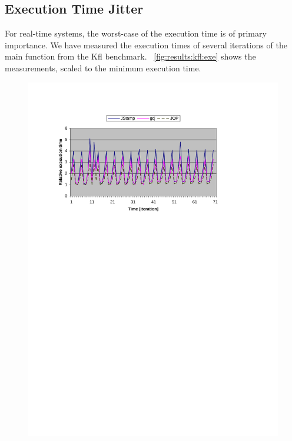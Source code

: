 



\subsection{Execution Time Jitter}

For real-time systems, the worst-case of the execution time is of
primary importance. We have measured the execution times of several
iterations of the main function from the Kfl benchmark.
\figurename~\ref{fig:results:kfl:exe} shows the measurements, scaled
to the minimum execution time.

\begin{figure}
    \centering
    \includegraphics[width=\excelwidth]{results/results_kfl_exe}

\end{figure}
